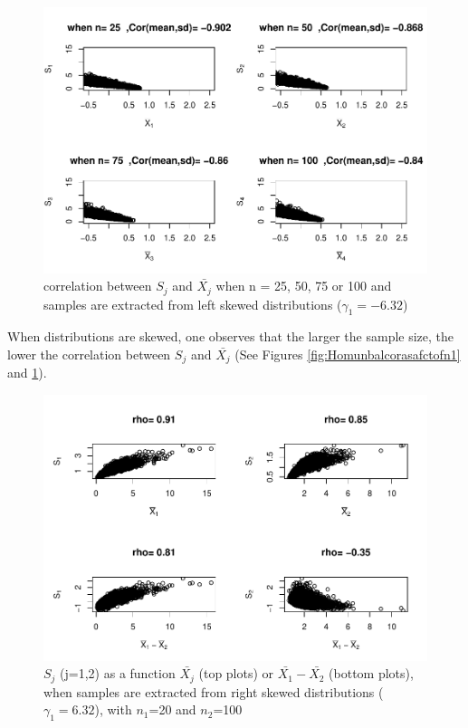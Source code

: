 \documentclass[
  man]{apa6}
\begin{document}
\begin{figure}
\centering
\includegraphics{Correlation_files/figure-latex/Homunbalcorasafctofn2-1.pdf}
\caption{\label{fig:Homunbalcorasafctofn2}correlation between \(S_j\) and \(\bar{X_j}\) when n = 25, 50, 75 or 100 and samples are extracted from left skewed distributions (\(\gamma_1 = -6.32\))}
\end{figure}

When distributions are skewed, one observes that the larger the sample size, the lower the correlation between \(S_j\) and \(\bar{X_j}\) (See Figures \ref{fig:Homunbalcorasafctofn1} and \ref{fig:Homunbalcorasafctofn2}).

\begin{figure}
\centering
\includegraphics{Correlation_files/figure-latex/pltSDHomunbalRskew-1.pdf}
\caption{\label{fig:pltSDHomunbalRskew}\(S_j\) (j=1,2) as a function \(\bar{X_j}\) (top plots) or \(\bar{X_1}-\bar{X_2}\) (bottom plots), when samples are extracted from right skewed distributions (\(\gamma_1 = 6.32\)), with \(n_1\)=20 and \(n_2\)=100}
\end{figure}
\end{document}
